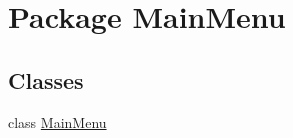 \hypertarget{namespace_main_menu}{\section{Package Main\-Menu}
\label{namespace_main_menu}
}
\subsection*{Classes}
\begin{DoxyCompactItemize}
\item 
class \hyperlink{class_main_menu_1_1_main_menu}{Main\-Menu}
\end{DoxyCompactItemize}
